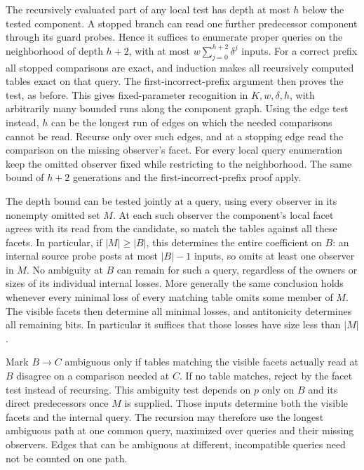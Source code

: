 The recursively evaluated part of any local test
has depth at most $h$ below the tested component.
A stopped branch can read one further predecessor
component through its guard probes. Hence it
suffices to enumerate proper queries on the
neighborhood of depth $h+2$, with at most
$w\sum_{j=0}^{h+2}\delta^j$ inputs. For a correct
prefix all stopped comparisons are exact, and
induction makes all recursively computed tables
exact on that query. The first-incorrect-prefix
argument then proves the test, as before. This
gives fixed-parameter recognition in $K,w,\delta,h$,
with arbitrarily many bounded runs along the
component graph.
Using the edge test instead, $h$ can be the longest
run of edges on which the needed comparisons
cannot be read. Recurse only over such edges, and
at a stopping edge read the comparison on the
missing observer's facet. For every local query
enumeration keep the omitted observer fixed while
restricting to the neighborhood. The same bound
of $h+2$ generations and the first-incorrect-prefix
proof apply.

The depth bound can be tested jointly at a query,
using every observer in its nonempty omitted set
$M$. At each such observer the component's local
facet agrees with its read from the candidate, so
match the tables against all these facets. In
particular, if $|M|\ge |B|$, this determines the
entire coefficient on $B$: an internal source
probe posts at most $|B|-1$ inputs, so omits at
least one observer in $M$. No ambiguity at $B$
can remain for such a query, regardless of the
owners or sizes of its individual internal losses.
More generally the same conclusion holds whenever
every minimal loss of every matching table omits
some member of $M$. The visible facets then
determine all minimal losses, and antitonicity
determines all remaining bits. In particular it
suffices that those losses have size less than
$|M|$.

Mark $B\to C$ ambiguous only if tables matching
the visible facets actually read at $B$ disagree on a
comparison needed at $C$. If no table matches,
reject by the facet test instead of recursing.
This ambiguity test depends on $p$ only on $B$
and its direct predecessors once $M$ is supplied.
Those inputs determine both the visible facets
and the internal query. The recursion may therefore use the longest
ambiguous path at one common query, maximized over
queries and their missing observers. Edges that
can be ambiguous at different, incompatible
queries need not be counted on one path.


